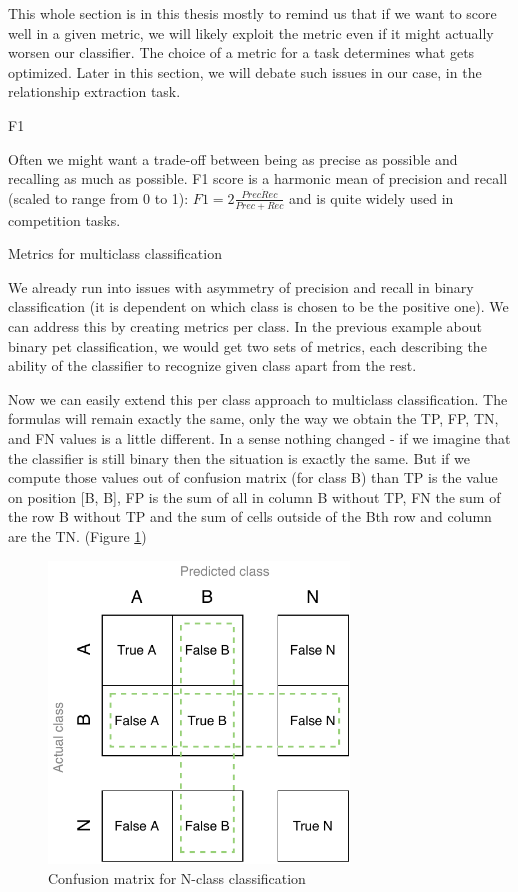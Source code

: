 This whole section is in this thesis mostly to remind us that if we want to score well in a given metric, we will likely exploit the metric even if it might actually worsen our classifier. The choice of a metric for a task determines what gets optimized. Later in this section, we will debate such issues in our case, in the relationship extraction task.




F1

Often we might want a trade-off between being as precise as possible and recalling as much as possible. F1 score is a harmonic mean of precision and recall (scaled to range from 0 to 1): $F1 = 2\frac{Prec \dot Rec}{Prec + Rec}$ and is quite widely used in competition tasks.

Metrics for multiclass classification

We already run into issues with asymmetry of precision and recall in binary classification (it is dependent on which class is chosen to be the positive one). We can address this by creating metrics per class. In the previous example about binary pet classification, we would get two sets of metrics, each describing the ability of the classifier to recognize given class apart from the rest.

Now we can easily extend this per class approach to multiclass classification. The formulas will remain exactly the same, only the way we obtain the TP, FP, TN, and FN values is a little different. In a sense nothing changed - if we imagine that the classifier is still binary then the situation is exactly the same. But if we compute those values out of confusion matrix (for class B) than TP is the value on position [B, B], FP is the sum of all in column B without TP, FN the sum of the row B without TP and the sum of cells outside of the Bth row and column are the TN. (Figure \ref{obr:BigCM})



\begin{figure}[h]\centering
\includegraphics[width=80mm]{./img//Diplomka diagramy-Big Confusion matric}
\caption{Confusion matrix for N-class classification}
\label{obr:BigCM}
\end{figure}







